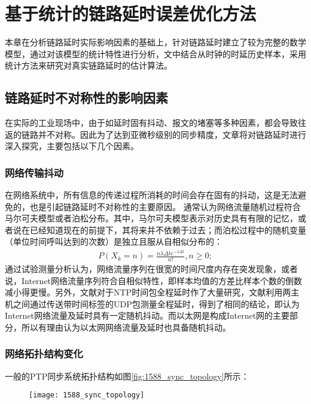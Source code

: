
\chapter{基于统计的链路延时误差优化方法}
\label{chap:statistical_delay}
本章在分析链路延时实际影响因素的基础上，针对链路延时建立了较为完整的数学模型，通过对该模型的统计特性进行分析，文中结合从时钟的时延历史样本，采用统计方法来研究对真实链路延时的估计算法。

\section{链路延时不对称性的影响因素}
在实际的工业现场中，由于如延时固有抖动、报文的堵塞等多种因素，都会导致往返的链路并不对称。因此为了达到亚微秒级别的同步精度，文章将对链路延时进行深入探究，主要包括以下几个因素。

\subsection{网络传输抖动}
在网络系统中，所有信息的传递过程所消耗的时间会存在固有的抖动，这是无法避免的，也是引起链路延时不对称性的主要原因。
通常认为网络流量随机过程符合马尔可夫模型或者泊松分布。其中，马尔可夫模型表示对历史具有有限的记忆，或者说在已经知道现在的前提下，其将来并不依赖于过去；而泊松过程中的随机变量（单位时间呼叫达到的次数）是独立且服从自相似分布的\supercite{12}：
\begin {align}
P(X_{k} = n) = \frac{n\lambda\Delta t e^{- \lambda\Delta t}}{n!},n\geq 0;
\end{align}
通过试验测量分析认为，网络流量序列在很宽的时间尺度内存在突发现象，或者说，Internet网络流量序列符合自相似特性\supercite{13,14,15,16}，即样本均值的方差比样本个数的倒数减小得更慢。另外，文献\parencite{17}对于NTP时间包全程延时作了大量研究，文献\parencite{18}利用两主机之间通过传送带时间标签的UDP包测量全程延时，得到了相同的结论，即认为Internet网络流量及延时具有一定随机抖动。而以太网是构成Internet网的主要部分，所以有理由认为以太网网络流量及延时也具备随机抖动。

\subsection{网络拓扑结构变化}
一般的PTP同步系统拓扑结构如图\ref{fig:1588_sync_topology}所示\supercite{2}：
\begin{figure}[htbp]
  \centering
  \begin{minipage}[b]{0.6\textwidth}
    \captionstyle{\centering}
    \centering
    \texttt{[image: 1588\_sync\_topology]}
  \end{minipage}     
\end{figure}
\\ \\ \\

